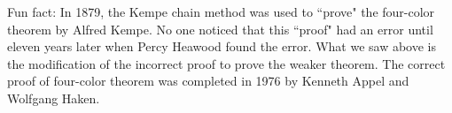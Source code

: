         Fun fact: In 1879, the Kempe chain method was used to ``prove" the four-color theorem by Alfred Kempe. No one noticed that this ``proof" had an error until eleven years later when Percy Heawood found the error. What we saw above is the modification of the incorrect proof to prove the weaker theorem. The correct proof of four-color theorem was completed in 1976 by Kenneth Appel and Wolfgang Haken.
    
